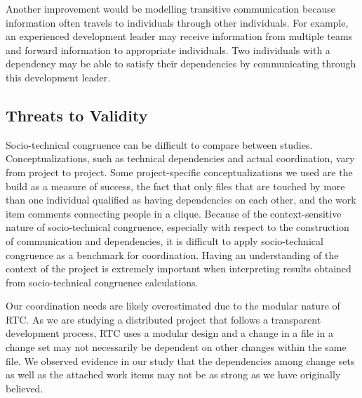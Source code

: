 Another improvement would be modelling transitive communication because information often travels to individuals through other individuals. For example, an experienced development leader may receive information from multiple teams and forward information to appropriate individuals. Two individuals with a dependency may be able to satisfy their dependencies by communicating through this development leader.

\subsection{Threats to Validity}
\label{sec:threats}


Socio-technical congruence can be difficult to compare between studies. Conceptualizations, such as technical dependencies and actual coordination, vary from project to project. Some project-specific conceptualizations we used are the build as a measure of success, the fact that only files that are touched by more than one individual qualified as having dependencies on each other, and the work item comments connecting people in a clique.
Because of the context-sensitive nature of socio-technical congruence, especially with respect to the construction of communication and dependencies, it is difficult to apply socio-technical congruence as a benchmark for coordination. Having an understanding of the context of the project is extremely important when interpreting results obtained from socio-technical congruence calculations.



Our coordination needs are likely overestimated due to the modular nature of RTC.
As we are studying a distributed project that follows a transparent development process, RTC uses a modular design \cite{maccormack2006} and a change in a file in a change set may not necessarily be dependent on other changes within the same file. 
We observed evidence in our study that the dependencies among change sets as well as the attached work items may not be as strong as we have originally believed.

